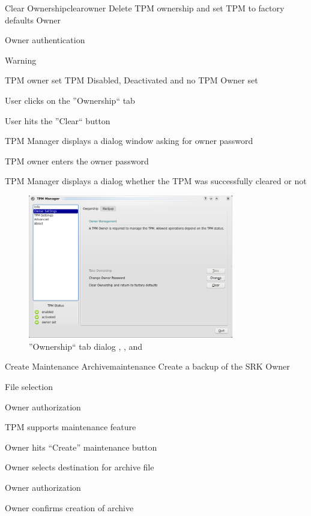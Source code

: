 \documentclass[
  american        %
]{sirrixreport}
\begin{document}
\begin{usecase}{Clear Ownership}{clearowner}
\ucdesc Delete TPM ownership and set TPM to factory defaults
\ucactors Owner
\ucinclude 
         \begin{compactitem}
            \item Owner authentication 
            \item Warning 
         \end{compactitem}
\ucprecond TPM owner set
\ucpostcond TPM Disabled, Deactivated and no TPM Owner set
\ucnormal
 \item User clicks on the ''Ownership`` tab
 \item User hits the ''Clear`` button
 \item TPM Manager displays a dialog window asking for owner password
 \item TPM owner enters the owner password
 \item TPM Manager displays a dialog whether the TPM was successfully cleared or not 
\ucendflow 
\end{usecase}

\begin{figure}[h]
 \centering
 \includegraphics[width=0.8\textwidth]{images/tpm_ownership}
 \caption{''Ownership`` tab dialog , ,  and }
\end{figure}
\clearpage


\begin{usecase}{Create Maintenance Archive}{maintenance}
\ucdesc Create a backup of the SRK
\ucactors  Owner
\ucinclude 
   \begin{compactitem}
      \item File selection
      \item Owner authorization
   \end{compactitem}
\ucprecond TPM supports maintenance feature
\ucnormal 
 \item Owner hits ``Create'' maintenance button
 \item Owner selects destination for archive file
 \item Owner authorization
 \item Owner confirms creation of archive
\ucendflow
\end{usecase}
\clearpage
\end{document}
